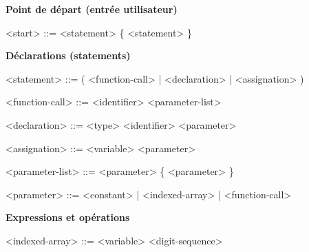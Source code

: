 \documentclass[french]{article}
\begin{document}
		\textbf{Point de départ (entrée utilisateur)}
		\begin{grammar}
			<start> ::= <statement> \{ <statement> \}
		\end{grammar}
		
		\textbf{Déclarations (statements)}
		\begin{grammar}
			<statement> ::= ( <function-call> | <declaration> | <assignation> ) \lit{;}
			
			<function-call> ::= <identifier> <parameter-list>
			
			<declaration> ::= <type> <identifier> \lit{=} <parameter>
			
			<assignation> ::= <variable> \lit{=} <parameter>
			
			<parameter-list> ::= \lit{(} <parameter> \{ \lit{,} <parameter> \} \lit{)}
			
			<parameter> ::= <constant> | <indexed-array> | <function-call>
		\end{grammar}
		
		\textbf{Expressions et opérations}
		\begin{grammar}
			<indexed-array> ::= <variable> \lit{[} <digit-sequence> \lit{]}
		\end{grammar}
		
\end{document}
